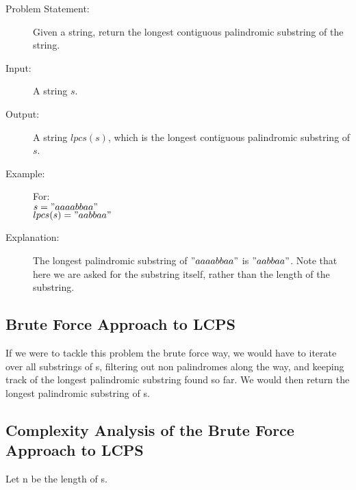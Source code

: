 \begin{description}
    \item[Problem Statement:]
        Given a string, return the longest contiguous palindromic substring of the string.

    \item[Input:] 
        A string $s$.
        
    \item[Output:] 
        A string $lpcs(s)$, which is the longest contiguous palindromic substring of $s$.
        
    \item[Example:] For:\\
        $s = "aaaabbaa"$\\
        $lpcs(s) = "aabbaa"$

    \item[Explanation:]
        The longest palindromic substring of $"aaaabbaa"$ is $"aabbaa"$.
        Note that here we are asked for the substring itself, rather than the length of the substring.
   
\end{description}

\subsection{Brute Force Approach to LCPS}
If we were to tackle this problem the brute force way, we would have to iterate over all substrings of s, filtering out non palindromes along the way,
and keeping track of the longest palindromic substring found so far. 
We would then return the longest palindromic substring of s.

\subsection{Complexity Analysis of the Brute Force Approach to LCPS}
Let n be the length of s.

